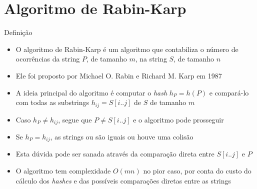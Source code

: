 \section{Algoritmo de Rabin-Karp}

\begin{frame}[fragile]{Definição}

    \begin{itemize}
        \item O algoritmo de Rabin-Karp é um algoritmo que contabiliza o número de ocorrências
            da string $P$, de tamanho $m$, na string $S$, de tamanho $n$
        \pause

        \item Ele foi proposto por Michael O. Rabin e Richard M. Karp em 1987
        \pause

        \item A ideia principal do algoritmo é computar o \textit{hash} $h_P = h(P)$ e compará-lo
            com todas as substrings $h_{ij} = S[i..j]$ de $S$ de tamanho $m$
        \pause

        \item Caso $h_P \neq h_{ij}$, segue que $P\neq S[i..j]$ e o algoritmo pode prosseguir
        \pause

        \item Se $h_P = h_{ij}$, as strings ou são iguais ou houve uma colisão
        \pause

        \item Esta dúvida pode ser sanada através da comparação direta entre $S[i..j]$ e $P$
        \pause

        \item O algoritmo tem complexidade $O(mn)$ no pior caso, por conta do custo do cálculo
            dos {\it hashes} e das possíveis comparações diretas entre as strings

    \end{itemize}

\end{frame}

